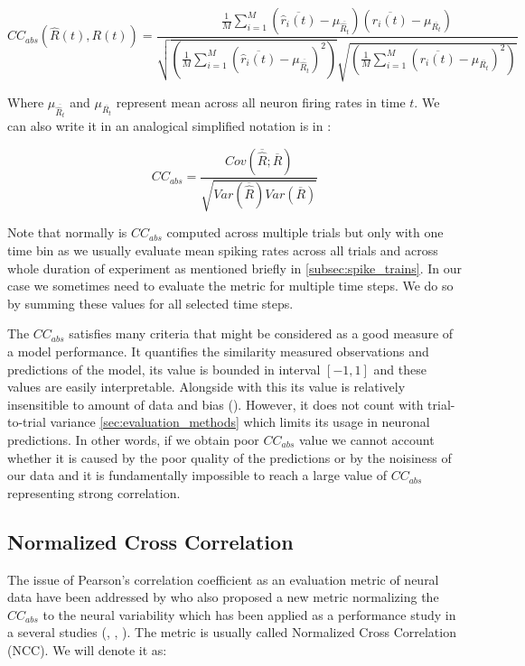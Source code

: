 \begin{equation}
    CC_{abs}(\hat{R}(t),R(t)) = 
    \frac{
        \frac{1}{M} \sum_{i=1}^{M} 
        \left(\overline{\hat{r}_{i}(t)}
        - \mu_{\overline{\hat{R}_t}}
        \right)
    \left(\overline{r_{i}(t)} 
        - \mu_{\overline{R_t}}
    \right)}
    {\sqrt{\left( 
        \frac{1}{M} \sum_{i=1}^{M} \left( \overline{\hat{r}_{i}(t)}
        - \mu_{\overline{\hat{R}_t}} \right)^2 
        \right)} 
        \sqrt{ \left( \frac{1}{M} \sum_{i=1}^{M} \left( \overline{r_{i}(t)}  
        - \mu_{\overline{R_t}} \right)^2 \right)}}
\end{equation}
\label{eq:pearson_neurons}

Where $\mu_{\overline{\hat{R}_t}}$ and $\mu_{\overline{R_t}}$ represent mean across all neuron firing rates in time $t$. We can also write it in an analogical simplified notation is in \citet{Wang2023towards}:

\begin{equation}
    CC_{abs} = \frac{Cov(\overline{\hat{R}}; \overline{R})}
    {\sqrt{Var(\overline{\hat{R}})Var(\overline{R})}}
\end{equation}
\label{eq:cc_abs}

Note that normally is $CC_{abs}$ computed across multiple trials but only with one time bin as we usually evaluate mean spiking rates across all trials and across whole duration of experiment as mentioned briefly in \ref{subsec:spike_trains}. In our case we sometimes need to evaluate the metric for multiple time steps. We do so by summing these values for all selected time steps.

The $CC_{abs}$ satisfies many criteria that might be considered as a good measure of a model performance. It quantifies the similarity measured observations and predictions of the model, its value is bounded in interval $[-1, 1]$ and these values are easily interpretable. Alongside with this its value is relatively insensitible to amount of data and bias (\citet{Wang2023towards}). However, it does not count with trial-to-trial variance \ref{sec:evaluation_methods} which limits its usage in neuronal predictions. In other words, if we obtain poor $CC_{abs}$ value we cannot account whether it is caused by the poor quality of the predictions or by the noisiness of our data and it is fundamentally impossible to reach a large value of $CC_{abs}$ representing strong correlation.

\subsection{Normalized Cross Correlation}
\label{subsec:normalized_cross_correlation}
The issue of Pearson's correlation coefficient as an evaluation metric of neural data have been addressed by \citet{hsu_quantifying_2004} who also proposed a new metric normalizing the $CC_{abs}$ to the neural variability which has been applied as a performance study in a several studies (\citet{touryan_spatial_2005}, \citet{gill_sound_2006}, \citet{Wang2023towards}). The metric is usually called Normalized Cross Correlation (NCC). We will denote it as:

